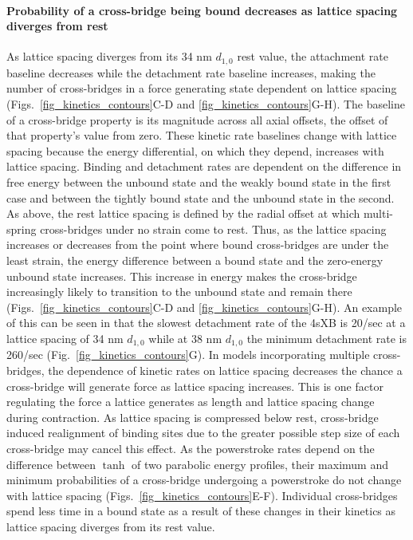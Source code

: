 \documentclass[]{article}
\begin{document}
\paragraph{Probability of a cross-bridge being bound decreases as lattice spacing diverges from rest} %
As lattice spacing diverges from its 34 nm $d_{1,0}$ rest value, the attachment rate baseline decreases while the detachment rate baseline increases, making the number of cross-bridges in a force generating state dependent on lattice spacing (Figs.~\ref{fig_kinetics_contours}C-D and \ref{fig_kinetics_contours}G-H). 
The baseline of a cross-bridge property is its magnitude across all axial offsets, the offset of that property's value from zero. 
These kinetic rate baselines change with lattice spacing because the energy differential, on which they depend, increases with lattice spacing.
Binding and detachment rates are dependent on the difference in free energy between the unbound state and the weakly bound state in the first case and between the tightly bound state and the unbound state in the second.
As above, the rest lattice spacing is defined by the radial offset at which multi-spring cross-bridges under no strain come to rest. 
Thus, as the lattice spacing increases or decreases from the point where bound cross-bridges are under the least strain, the energy difference between a bound state and the zero-energy unbound state increases. 
This increase in energy makes the cross-bridge increasingly likely to transition to the unbound state and remain there (Figs.~\ref{fig_kinetics_contours}C-D and  \ref{fig_kinetics_contours}G-H). 
An example of this can be seen in that the slowest detachment rate of the 4sXB is 20/sec at a lattice spacing of 34 nm $d_{1,0}$ while at 38 nm $d_{1,0}$ the minimum detachment rate is 260/sec (Fig.~\ref{fig_kinetics_contours}G).
In models incorporating multiple cross-bridges, the dependence of kinetic rates on lattice spacing decreases the chance a cross-bridge will generate force as lattice spacing increases. 
This is one factor regulating the force a lattice generates as length and lattice spacing change during contraction.
As lattice spacing is compressed below rest, cross-bridge induced realignment of binding sites due to the greater possible step size of each cross-bridge may cancel this effect.
As the powerstroke rates depend on the difference between $\tanh$ of two parabolic energy profiles, their maximum and minimum probabilities of a cross-bridge undergoing a powerstroke do not change with lattice spacing (Figs.~\ref{fig_kinetics_contours}E-F). 
Individual cross-bridges spend less time in a bound state as a result of these changes in their kinetics as lattice spacing diverges from its rest value.
\end{document}
